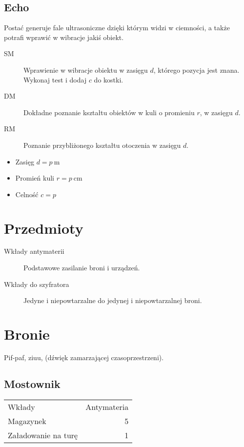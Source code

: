 \subsection{Echo}
Postać generuje fale ultrasoniczne dzięki którym widzi w ciemności, a także potrafi wprawić w wibracje jakiś obiekt.
\begin{description}
	\item[SM] Wprawienie w wibracje obiektu w zasięgu $d$, którego pozycja jest znana. Wykonaj test \aba{} i dodaj $c$ do kostki.
	\item[DM] Dokładne poznanie kształtu obiektów w kuli o promieniu $r$, w zasięgu $d$.
	\item[RM] Poznanie przybliżonego kształtu otoczenia w zasięgu $d$.
\end{description}
\begin{itemize}
	\item Zasięg $d = p \ \si{\meter}$
	\item Promień kuli $r = p \ \si{\centi\meter}$
	\item Celność $c = p$
\end{itemize}


\section{Przedmioty}
\begin{description}
	\item[Wkłady antymaterii] Podstawowe zasilanie broni i urządzeń.
	\item[Wkłady do szyfratora] Jedyne i niepowtarzalne do jedynej i niepowtarzalnej broni.
\end{description}

\section{Bronie}
Pif-paf, ziuu, (dźwięk zamarzającej czasoprzestrzeni).
\subsection{Mostownik \abs{}}

\begin{tabular}{lr}
Wkłady & Antymateria \\
Magazynek & 5 \\
Załadowanie na turę & 1 \\
\end{tabular}

